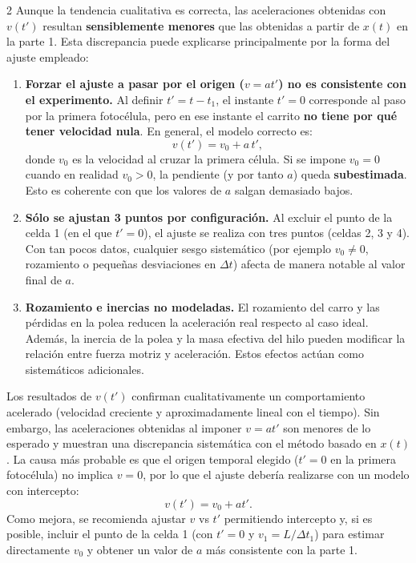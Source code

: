 \documentclass[12pt,a4paper]{article}
\begin{document}
\begin{multicols}{2}
\bigskip
Aunque la tendencia cualitativa es correcta, las aceleraciones obtenidas con $v(t')$ resultan \textbf{sensiblemente menores} que las obtenidas a partir de $x(t)$ en la parte 1. Esta discrepancia puede explicarse principalmente por la forma del ajuste empleado:

\begin{enumerate}
\item \textbf{Forzar el ajuste a pasar por el origen ($v=at'$) no es consistente con el experimento.}
Al definir $t'=t-t_1$, el instante $t'=0$ corresponde al paso por la primera fotocélula, pero en ese instante el carrito \textbf{no tiene por qué tener velocidad nula}. En general, el modelo correcto es:
\begin{equation}
v(t') = v_0 + a\,t',
\end{equation}
donde $v_0$ es la velocidad al cruzar la primera célula. Si se impone $v_0=0$ cuando en realidad $v_0>0$, la pendiente (y por tanto $a$) queda \textbf{subestimada}. Esto es coherente con que los valores de $a$ salgan demasiado bajos.

\item \textbf{Sólo se ajustan 3 puntos por configuración.}
Al excluir el punto de la celda 1 (en el que $t'=0$), el ajuste se realiza con tres puntos (celdas 2, 3 y 4). Con tan pocos datos, cualquier sesgo sistemático (por ejemplo $v_0\neq 0$, rozamiento o pequeñas desviaciones en $\Delta t$) afecta de manera notable al valor final de $a$.

\item \textbf{Rozamiento e inercias no modeladas.}
El rozamiento del carro y las pérdidas en la polea reducen la aceleración real respecto al caso ideal. Además, la inercia de la polea y la masa efectiva del hilo pueden modificar la relación entre fuerza motriz y aceleración. Estos efectos actúan como sistemáticos adicionales.
\end{enumerate}

Los resultados de $v(t')$ confirman cualitativamente un comportamiento acelerado (velocidad creciente y aproximadamente lineal con el tiempo). Sin embargo, las aceleraciones obtenidas al imponer $v=at'$ son menores de lo esperado y muestran una discrepancia sistemática con el método basado en $x(t)$. La causa más probable es que el origen temporal elegido ($t'=0$ en la primera fotocélula) no implica $v=0$, por lo que el ajuste debería realizarse con un modelo con intercepto:
\[
v(t') = v_0 + a t'.
\]
Como mejora, se recomienda ajustar $v$ vs $t'$ permitiendo intercepto y, si es posible, incluir el punto de la celda 1 (con $t'=0$ y $v_1=L/\Delta t_1$) para estimar directamente $v_0$ y obtener un valor de $a$ más consistente con la parte 1.


\end{multicols}
\end{document}
